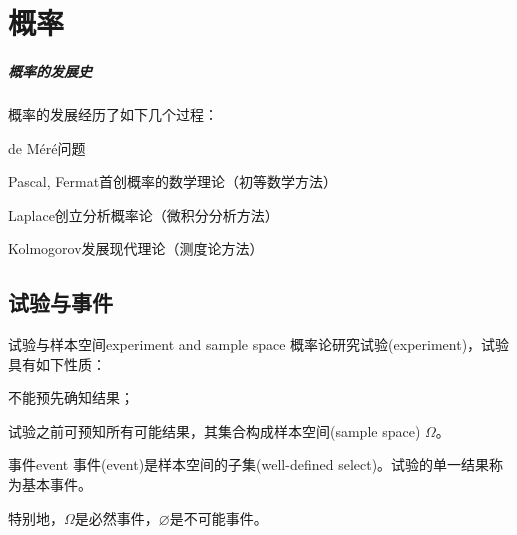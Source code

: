 	
\chapter{概率}
\paragraph{概率的发展史}
概率的发展经历了如下几个过程：
\begin{compactitem}
	\item de M\'er\'e问题
	\item Pascal, Fermat首创概率的数学理论（初等数学方法）
	\item Laplace创立分析概率论（微积分分析方法）
	\item Kolmogorov发展现代理论（测度论方法）
\end{compactitem}
\section{试验与事件}
\begin{definition}{试验与样本空间}{experiment and sample space}
    概率论研究试验(experiment)，试验具有如下性质：
    \begin{compactenum}
    	\item 不能预先确知结果；
    	\item 试验之前可预知所有可能结果，其集合构成样本空间(sample space) $\Omega$。
    \end{compactenum}
\end{definition}
\begin{definition}{事件}{event}
    事件(event)是样本空间的子集(well-defined select)。试验的单一结果称为基本事件。

    特别地，$\Omega$是必然事件，$\varnothing$是不可能事件。
\end{definition}

